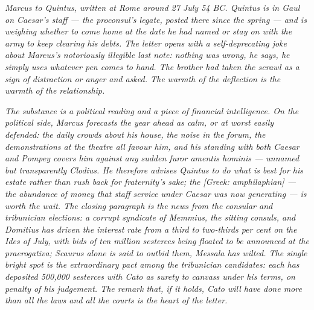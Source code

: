 
\textit{Marcus to Quintus, written at Rome around 27 July 54 BC.
Quintus is in Gaul on Caesar's staff --- the proconsul's
legate, posted there since the spring --- and is weighing
whether to come home at the date he had named or stay on
with the army to keep clearing his debts. The letter opens
with a self-deprecating joke about Marcus's notoriously
illegible last note: nothing was wrong, he says, he simply
uses whatever pen comes to hand. The brother had taken the
scrawl as a sign of distraction or anger and asked. The
warmth of the deflection is the warmth of the relationship.}

\textit{The substance is a political reading and a piece of
financial intelligence. On the political side, Marcus
forecasts the year ahead as calm, or at worst easily
defended: the daily crowds about his house, the noise in the
forum, the demonstrations at the theatre all favour him,
and his standing with both Caesar and Pompey covers him
against any sudden \textit{furor amentis hominis} ---
unnamed but transparently Clodius. He therefore advises
Quintus to do what is best for his estate rather than rush
back for fraternity's sake; the
\textit{\textit{[Greek: amphilaphian]}} --- the abundance
of money that staff service under Caesar was now generating
--- is worth the wait. The closing paragraph is the news
from the consular and tribunician elections: a corrupt
syndicate of Memmius, the sitting consuls, and Domitius
has driven the interest rate from a third to two-thirds
per cent on the Ides of July, with bids of ten million
sesterces being floated to be announced at the
\textit{praerogativa}; Scaurus alone is said to outbid
them, Messala has wilted. The single bright spot is the
extraordinary pact among the tribunician candidates: each
has deposited 500,000 sesterces with Cato as surety to
canvass under his terms, on penalty of his judgement. The
remark that, if it holds, Cato will have done more than
all the laws and all the courts is the heart of the
letter.}
